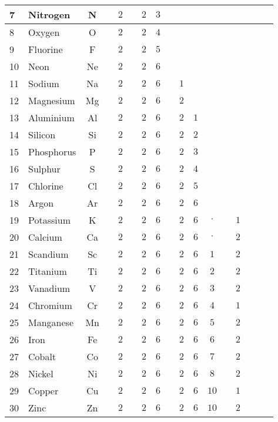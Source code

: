 \begin{table}[H]
\begin{center}
\begin{tabular}{|l|lc|c|c|c|c|c|c|c|c|c|c|c|c|c|c|}
				7 & Nitrogen & N & & $2$ & & $2$ & $3$ \\ \hline
				8 & Oxygen & O & & $2$ & & $2$ & $4$ \\ \hline
				9 & Fluorine & F & & $2$ & & $2$ & $5$ \\ \hline
				10 & Neon & Ne & & $2$ & & $2$ & $6$ \\ \hline
				11 & Sodium & Na & & $2$ & & $2$ & $6$ & & $1$ \\ \hline
				12 & Magnesium & Mg & & $2$ & & $2$ & $6$ & & $2$ \\ \hline
				13 & Aluminium & Al & & $2$ & & $2$ & $6$ & & $2$ & $1$ \\ \hline
				14 & Silicon & Si & & $2$ & & $2$ & $6$ & & $2$ & $2$ \\ \hline
				15 & Phosphorus & P & & $2$ & & $2$ & $6$ & & $2$ & $3$ \\ \hline
				16 & Sulphur & S & & $2$ & & $2$ & $6$ & & $2$ & $4$ \\ \hline
				17 & Chlorine & Cl & & $2$ & & $2$ & $6$ & & $2$ & $5$ \\ \hline
				18 & Argon & Ar & & $2$ & & $2$ & $6$ & & $2$ & $6$ \\ \hline
				19 & Potassium & K & & $2$ & & $2$ & $6$ & & $2$ & $6$ & $\cdot$ & & $1$ \\ \hline
				20 & Calcium & Ca & & $2$ & & $2$ & $6$ & & $2$ & $6$ & $\cdot$ & & $2$ \\ \hline
				21 & Scandium & Sc & & $2$ & & $2$ & $6$ & & $2$ & $6$ & $1$ & & $2$ \\ \hline
				22 & Titanium & Ti & & $2$ & & $2$ & $6$ & & $2$ & $6$ & $2$ & & $2$ \\ \hline
				23 & Vanadium & V & & $2$ & & $2$ & $6$ & & $2$ & $6$ & $3$ & & $2$ \\ \hline
				24 & Chromium & Cr & & $2$ & & $2$ & $6$ & & $2$ & $6$ & $4$ & & $1$ \\ \hline
				25 & Manganese & Mn & & $2$ & & $2$ & $6$ & & $2$ & $6$ & $5$ & & $2$ \\ \hline
				26 & Iron & Fe & & $2$ & & $2$ & $6$ & & $2$ & $6$ & $6$ & & $2$ \\ \hline
				27 & Cobalt & Co & & $2$ & & $2$ & $6$ & & $2$ & $6$ & $7$ & & $2$ \\ \hline
				28 & Nickel & Ni & & $2$ & & $2$ & $6$ & & $2$ & $6$ & $8$ & & $2$ \\ \hline
				29 & Copper & Cu & & $2$ & & $2$ & $6$ & & $2$ & $6$ & $10$ & & $1$ \\ \hline
				30 & Zinc & Zn & & $2$ & & $2$ & $6$ & & $2$ & $6$ & $10$ & & $2$ \\ \hline

\end{tabular}
\end{center}
\end{table}
